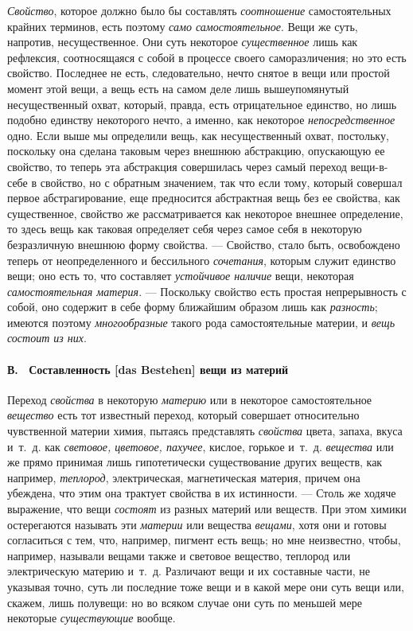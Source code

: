 {\em Свойство}, которое должно было бы составлять
{\em соотношение} самостоятельных крайних терминов,
есть поэтому {\em само самостоятельное}. Вещи же суть,
напротив, несущественное. Они суть некоторое
{\em существенное} лишь как рефлексия, соотносящаяся с
собой в процессе своего саморазличения; но это есть свойство. Последнее не
есть, следовательно, нечто снятое в вещи или простой момент этой вещи, а
вещь есть на самом деле лишь вышеупомянутый несущественный охват, который,
правда, есть отрицательное единство, но лишь подобно единству некоторого
нечто, а именно, как некоторое {\em непосредственное}
одно. Если выше мы определили вещь, как несущественный охват, постольку,
поскольку она сделана таковым через внешнюю абстракцию, опускающую ее
свойство, то теперь эта абстракция совершилась через самый переход
вещи-в-себе в свойство, но с обратным значением, так что если тому, который
совершал первое абстрагирование, еще предносится абстрактная вещь без ее
свойства, как существенное, свойство же рассматривается как некоторое
внешнее определение, то здесь вещь как таковая определяет себя через самое
себя в некоторую безразличную внешнюю форму свойства. — Свойство, стало
быть, освобождено теперь от неопределенного и бессильного
{\em сочетания}, которым служит единство вещи; оно есть
то, что составляет {\em устойчивое наличие} вещи,
некоторая {\em самостоятельная материя}. — Поскольку
свойство есть простая непрерывность с собой, оно содержит в себе форму
ближайшим образом лишь как {\em разность}; имеются
поэтому {\em многообразные} такого рода самостоятельные
материи, и {\em вещь состоит из них}.

\paragraph[В. \ Составленность [das Bestehen{]} вещи из материй]{В.
\ Составленность [das Bestehen] вещи из материй}
Переход {\em свойства} в
некоторую {\em материю} или в некоторое самостоятельное
{\em вещество} есть тот известный переход, который
совершает относительно чувственной материи химия, пытаясь представлять
{\em свойства} цвета, запаха, вкуса и~т.~д. как
{\em световое, цветовое, пахучее}, кислое, горькое
и~т.~д. {\em вещества} или же прямо принимая лишь
гипотетически существование других веществ, как например,
{\em теплород}, электрическая, магнетическая материя,
причем она убеждена, что этим она трактует свойства в их истинности. —
Столь же ходяче выражение, что вещи {\em состоят} из
разных материй или веществ. При этом химики остерегаются называть эти
{\em материи} или вещества
{\em вещами}, хотя они и готовы согласиться с тем, что,
например, пигмент есть вещь; но мне неизвестно, чтобы, например, называли
вещами также и световое вещество, теплород или электрическую материю
и~т.~д. Различают вещи и их составные части, не указывая точно, суть ли
последние тоже вещи и в какой мере они суть вещи или, скажем, лишь
полувещи: но во всяком случае они суть по меньшей мере некоторые
{\em существующие} вообще.

